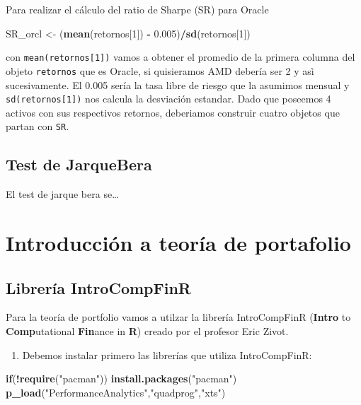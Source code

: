 \documentclass[12pt,]{book}
\newenvironment{Shaded}{\begin{snugshade}}{\end{snugshade}}
\newcommand{\KeywordTok}[1]{\textcolor[rgb]{0.13,0.29,0.53}{\textbf{#1}}}
\newcommand{\DecValTok}[1]{\textcolor[rgb]{0.00,0.00,0.81}{#1}}
\newcommand{\FloatTok}[1]{\textcolor[rgb]{0.00,0.00,0.81}{#1}}
\newcommand{\StringTok}[1]{\textcolor[rgb]{0.31,0.60,0.02}{#1}}
\newcommand{\ControlFlowTok}[1]{\textcolor[rgb]{0.13,0.29,0.53}{\textbf{#1}}}
\newcommand{\OperatorTok}[1]{\textcolor[rgb]{0.81,0.36,0.00}{\textbf{#1}}}
\newcommand{\NormalTok}[1]{#1}
\providecommand{\tightlist}{%
  \setlength{\itemsep}{0pt}\setlength{\parskip}{0pt}}
\begin{document}
Para realizar el cálculo del ratio de Sharpe (SR) para Oracle

\begin{Shaded}
\begin{Highlighting}[]
\NormalTok{SR_orcl <-}\StringTok{ }\NormalTok{(}\KeywordTok{mean}\NormalTok{(retornos[}\DecValTok{1}\NormalTok{]) }\OperatorTok{-}\StringTok{ }\FloatTok{0.005}\NormalTok{)}\OperatorTok{/}\KeywordTok{sd}\NormalTok{(retornos[}\DecValTok{1}\NormalTok{])}
\end{Highlighting}
\end{Shaded}

con \texttt{mean(retornos{[}1{]})} vamos a obtener el promedio de la
primera columna del objeto \texttt{retornos} que es Oracle, si
quisieramos AMD debería ser 2 y asì sucesivamente. El 0.005 sería la
tasa libre de riesgo que la asumimos mensual y
\texttt{sd(retornos{[}1{]})} nos calcula la desviación estandar. Dado
que poseemos 4 activos con sus respectivos retornos, deberiamos
construir cuatro objetos que partan con \texttt{SR}.

\section{Test de JarqueBera}\label{test-de-jarquebera}

El test de jarque bera se\ldots{}

\chapter{Introducción a teoría de portafolio}\label{portafolio}

\section{Librería IntroCompFinR}\label{libreria-introcompfinr}

Para la teoría de portfolio vamos a utilzar la librería IntroCompFinR
(\textbf{Intro} to \textbf{Comp}utational \textbf{Fin}ance in
\textbf{R}) creado por el profesor Eric Zivot.

\begin{enumerate}
\def\labelenumi{\arabic{enumi}.}
\tightlist
\item
  Debemos instalar primero las librerías que utiliza IntroCompFinR:
\end{enumerate}

\begin{Shaded}
\begin{Highlighting}[]
\ControlFlowTok{if}\NormalTok{(}\OperatorTok{!}\KeywordTok{require}\NormalTok{(}\StringTok{"pacman"}\NormalTok{)) }\KeywordTok{install.packages}\NormalTok{(}\StringTok{"pacman"}\NormalTok{)}
\KeywordTok{p_load}\NormalTok{(}\StringTok{"PerformanceAnalytics"}\NormalTok{,}\StringTok{"quadprog"}\NormalTok{,}\StringTok{"xts"}\NormalTok{)}
\end{Highlighting}
\end{Shaded}
\end{document}
